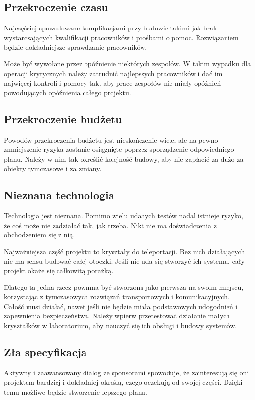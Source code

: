 \subsection{Przekroczenie czasu}
Najczęściej spowodowane komplikacjami przy budowie takimi jak brak wystarczających kwalifikacji pracowników i prośbami o pomoc.
Rozwiązaniem będzie dokładniejsze sprawdzanie pracowników.

Może być wywołane przez opóźnienie niektórych zespołów. 
W takim wypadku dla operacji krytycznych należy zatrudnić najlepszych pracowników i dać im najwięcej kontroli i pomocy tak, aby prace zespołów nie miały opóźnień powodujących opóźnienia całego projektu.

\subsection{Przekroczenie budżetu}
Powodów przekroczenia budżetu jest nieskończenie wiele, ale na pewno zmniejszenie ryzyka zostanie osiągnięte poprzez sporządzenie odpowiedniego planu.
Należy w nim tak określić kolejność budowy, aby nie zapłacić za dużo za obiekty tymczasowe i za zmiany.

\subsection{Nieznana technologia}
Technologia jest nieznana. Pomimo wielu udanych testów nadal istnieje ryzyko, że coś może nie zadziałać tak, jak trzeba. Nikt nie ma doświadczenia z obchodzeniem się z nią.

Najważniejsza część projektu to kryształy do teleportacji. Bez nich działających nie ma sensu budować całej otoczki.
Jeśli nie uda się stworzyć ich systemu, cały projekt okaże się całkowitą porażką.

Dlatego ta jedna rzecz powinna być stworzona jako pierwsza na swoim miejscu, korzystając z tymczasowych rozwiązań transportowych i komunikacyjnych.
Całość musi działać, nawet jeśli nie będzie miała podstawowych udogodnień i zapewnienia bezpieczeństwa.
Należy wpierw przetestować działanie małych kryształków w laboratorium, aby nauczyć się ich obsługi i budowy systemów.

\subsection{Zła specyfikacja}
Aktywny i zaawansowany dialog ze sponsorami spowoduje, że zainteresują się oni projektem bardziej i dokładniej określą, czego oczekują od swojej części.
Dzięki temu możliwe będzie stworzenie lepszego planu.

